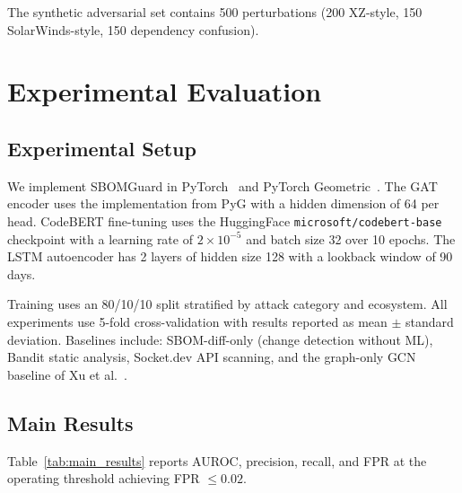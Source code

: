 \documentclass[sigconf,nonacm]{acmart}
\begin{document}
The synthetic adversarial set contains 500 perturbations (200 XZ-style, 150
SolarWinds-style, 150 dependency confusion).

\section{Experimental Evaluation}

\subsection{Experimental Setup}

We implement SBOMGuard in PyTorch~\cite{pytorch} and PyTorch Geometric~\cite{pyg}.
The GAT encoder uses the implementation from PyG with a hidden dimension of 64 per
head. CodeBERT fine-tuning uses the HuggingFace
\texttt{microsoft/codebert-base}~\cite{feng2020codebert} checkpoint with a learning
rate of $2 \times 10^{-5}$ and batch size 32 over 10 epochs. The LSTM autoencoder
has 2 layers of hidden size 128 with a lookback window of 90 days.

Training uses an 80/10/10 split stratified by attack category and ecosystem.
All experiments use 5-fold cross-validation with results reported as mean $\pm$
standard deviation. Baselines include: SBOM-diff-only (change detection without
ML), Bandit static analysis, Socket.dev API scanning, and the graph-only
GCN baseline of Xu et al.~\cite{xu2023supplyml}.

\subsection{Main Results}

Table~\ref{tab:main_results} reports AUROC, precision, recall, and FPR at the
operating threshold achieving FPR $\leq 0.02$.
\end{document}
